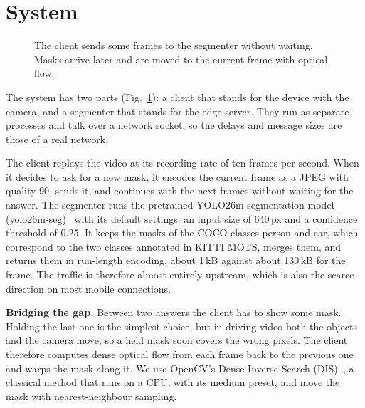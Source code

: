 \documentclass[conference]{IEEEtran}
\begin{document}
\section{System}

\begin{figure}[t]
\centering
{}
\caption{The client sends some frames to the segmenter without waiting. Masks arrive later and are moved to the current frame with optical flow.}
\label{fig:system}
\end{figure}

The system has two parts (Fig.~\ref{fig:system}): a client that stands for the device with the camera, and a segmenter that stands for the edge server. They run as separate processes and talk over a network socket, so the delays and message sizes are those of a real network.

The client replays the video at its recording rate of ten frames per second. When it decides to ask for a new mask, it encodes the current frame as a JPEG with quality 90, sends it, and continues with the next frames without waiting for the answer. The segmenter runs the pretrained YOLO26m segmentation model (yolo26m-seg)~\cite{jocher2026yolo26, ultralytics} with its default settings: an input size of 640\,px and a confidence threshold of 0.25. It keeps the masks of the COCO classes person and car, which correspond to the two classes annotated in KITTI MOTS, merges them, and returns them in run-length encoding, about 1\,kB against about 130\,kB for the frame. The traffic is therefore almost entirely upstream, which is also the scarce direction on most mobile connections.

\textbf{Bridging the gap.} Between two answers the client has to show some mask. Holding the last one is the simplest choice, but in driving video both the objects and the camera move, so a held mask soon covers the wrong pixels. The client therefore computes dense optical flow from each frame back to the previous one and warps the mask along it. We use OpenCV's Dense Inverse Search (DIS)~\cite{kroeger2016dis}, a classical method that runs on a CPU, with its medium preset, and move the mask with nearest-neighbour sampling.
\end{document}
